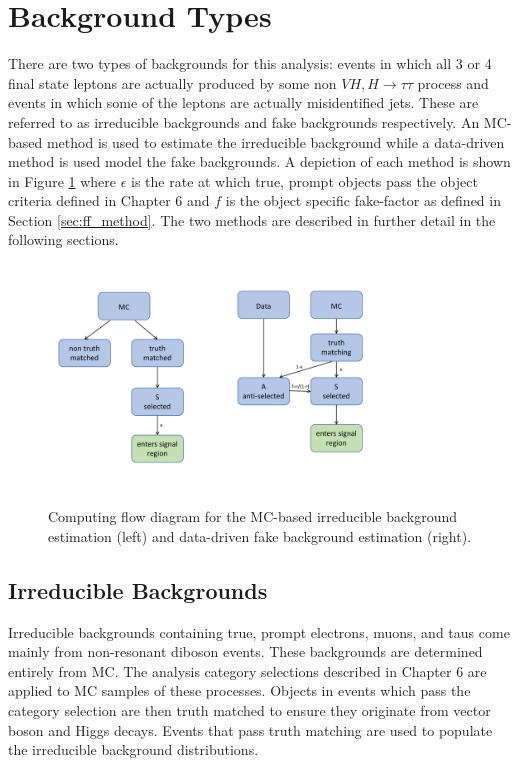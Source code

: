 \section{Background Types}
There are two types of backgrounds for this analysis: events in which all 3 or 4 final state leptons are actually produced by some non $VH,H\rightarrow\tau\tau$ process and events in which some of the leptons are actually misidentified jets. These are referred to as irreducible backgrounds and fake backgrounds respectively. An MC-based method is used to estimate the irreducible background while a data-driven method is used model the fake backgrounds. A depiction of each method is shown in Figure \ref{fig:bkg_diag} where $\epsilon$ is the rate at which true, prompt objects pass the object criteria defined in Chapter 6 and $f$ is the object specific fake-factor as defined in Section \ref{sec:ff_method}. The two methods are described in further detail in the following sections.

\begin{figure}[htb!]
    \centering
    \includegraphics[width=5in]{figures/chapter7/background_diagram.pdf}
    \caption{Computing flow diagram for the MC-based irreducible background estimation (left) and data-driven fake background estimation (right).}
    \label{fig:bkg_diag}
\end{figure}
\subsection{Irreducible Backgrounds}
Irreducible backgrounds containing true, prompt electrons, muons, and taus come mainly from non-resonant diboson events. These backgrounds are determined entirely from MC. The analysis category selections described in Chapter 6 are applied to MC samples of these processes. Objects in events which pass the category selection are then truth matched to ensure they originate from vector boson and Higgs decays. Events that pass truth matching are used to populate the irreducible background distributions. 

